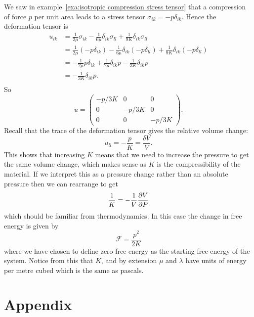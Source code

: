 \documentclass[a4paper]{article}
\newcommand{\freeEnergy}{\mathcal{F}}
\begin{document}
    We saw in example~\ref{exa:isotropic compression stress tensor} that a compression of force \(p\) per unit area leads to a stress tensor \(\sigma_{ik} = -p\delta_{ik}\).
    Hence the deformation tensor is
    \begin{align*}
        u_{ik} &=  \frac{1}{2\mu}\sigma_{ik} - \frac{1}{6\mu}\delta_{ik}\sigma_{ll} + \frac{1}{9K}\delta_{ik}\sigma_{ll}\\
        &= \frac{1}{2\mu}(-p\delta_{ik}) - \frac{1}{6\mu}\delta_{ik}(-p\delta_{ll}) + \frac{1}{9K}\delta_{ik}(-p\delta_{ll})\\
        &= -\frac{1}{2\mu}p\delta_{ik} + \frac{1}{2\mu}\delta_{ik}p - \frac{1}{3K}\delta_{ik}p\\
        &= - \frac{1}{3K}\delta_{ik}p.\\
    \end{align*}
    So
    \[
        u = 
        \begin{pmatrix}
            -p/3K & 0 & 0\\
            0 & -p/3K & 0\\
            0 & 0 & -p/3K
        \end{pmatrix}
        .
    \]
    Recall that the trace of the deformation tensor gives the relative volume change:
    \[u_{ll} = -\frac{p}{K} = \frac{\delta V}{V}.\]
    This shows that increasing \(K\) means that we need to increase the pressure to get the same volume change, which makes sense as \(K\) is the compressibility of the material.
    If we interpret this as a pressure change rather than an absolute pressure then we can rearrange to get
    \[\frac{1}{K} = -\frac{1}{V}\pdv{V}{P}\]
    which should be familiar from thermodynamics.
    In this case the change in free energy is given by
    \[\freeEnergy = \frac{p^2}{2K}\]
    where we have chosen to define zero free energy as the starting free energy of the system.
    Notice from this that \(K\), and by extension \(\mu\) and \(\lambda\) have units of energy per metre cubed which is the same as pascals.
    
    \tikzexternaldisable
    
    \clearpage
    \appendix
    \part*{Appendix}
    \begingroup
    \let\clearpage\relax
    
    \endgroup 
\end{document}
